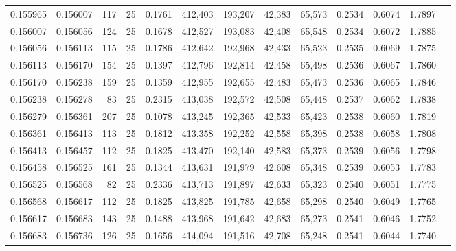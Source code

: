 \begin{tabular}{rrrrrrrrrrrrr}
0.155965 & 0.156007 &   117 &  25 &                                     0.1761 & 412,403 & 193,207 &  42,383 &  65,573 & 0.2534 & 0.6074 & 1.7897 \\
0.156007 & 0.156056 &   124 &  25 &                                     0.1678 & 412,527 & 193,083 &  42,408 &  65,548 & 0.2534 & 0.6072 & 1.7885 \\
0.156056 & 0.156113 &   115 &  25 &                                     0.1786 & 412,642 & 192,968 &  42,433 &  65,523 & 0.2535 & 0.6069 & 1.7875 \\
0.156113 & 0.156170 &   154 &  25 &                                     0.1397 & 412,796 & 192,814 &  42,458 &  65,498 & 0.2536 & 0.6067 & 1.7860 \\
0.156170 & 0.156238 &   159 &  25 &                                     0.1359 & 412,955 & 192,655 &  42,483 &  65,473 & 0.2536 & 0.6065 & 1.7846 \\
0.156238 & 0.156278 &    83 &  25 &                                     0.2315 & 413,038 & 192,572 &  42,508 &  65,448 & 0.2537 & 0.6062 & 1.7838 \\
0.156279 & 0.156361 &   207 &  25 &                                     0.1078 & 413,245 & 192,365 &  42,533 &  65,423 & 0.2538 & 0.6060 & 1.7819 \\
0.156361 & 0.156413 &   113 &  25 &                                     0.1812 & 413,358 & 192,252 &  42,558 &  65,398 & 0.2538 & 0.6058 & 1.7808 \\
0.156413 & 0.156457 &   112 &  25 &                                     0.1825 & 413,470 & 192,140 &  42,583 &  65,373 & 0.2539 & 0.6056 & 1.7798 \\
0.156458 & 0.156525 &   161 &  25 &                                     0.1344 & 413,631 & 191,979 &  42,608 &  65,348 & 0.2539 & 0.6053 & 1.7783 \\
0.156525 & 0.156568 &    82 &  25 &                                     0.2336 & 413,713 & 191,897 &  42,633 &  65,323 & 0.2540 & 0.6051 & 1.7775 \\
0.156568 & 0.156617 &   112 &  25 &                                     0.1825 & 413,825 & 191,785 &  42,658 &  65,298 & 0.2540 & 0.6049 & 1.7765 \\
0.156617 & 0.156683 &   143 &  25 &                                     0.1488 & 413,968 & 191,642 &  42,683 &  65,273 & 0.2541 & 0.6046 & 1.7752 \\
0.156683 & 0.156736 &   126 &  25 &                                     0.1656 & 414,094 & 191,516 &  42,708 &  65,248 & 0.2541 & 0.6044 & 1.7740 \\

\end{tabular}
